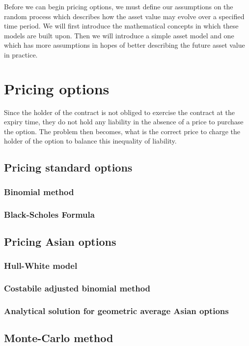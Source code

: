 Before we can begin pricing options, we must define our assumptions on the random process which describes how the asset value may evolve over a specified time period. We will first introduce the mathematical concepts in which these models are built upon. Then we will introduce a simple asset model and one which has more assumptions in hopes of better describing the future asset value in practice.

\section{Pricing options}

Since the holder of the contract is not obliged to exercise the contract at the expiry time, they do not hold any liability in the absence of a price to purchase the option. The problem then becomes, what is the correct price to charge the holder of the option to balance this inequality of liability.

\subsection{Pricing standard options}

\subsubsection{Binomial method}

\subsubsection{Black-Scholes Formula}

\subsection{Pricing Asian options}

\subsubsection{Hull-White model}

\subsubsection{Costabile adjusted binomial method}

\subsubsection{Analytical solution for geometric average Asian options}

\subsection{Monte-Carlo method}